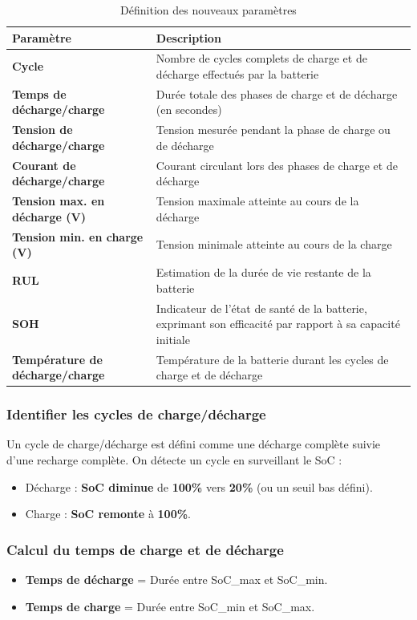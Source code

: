 \begin{table}[H]
	\centering
	\caption{Définition des nouveaux paramètres}
	\begin{tabular}{|p{6cm}|p{9cm}|}
		\hline
		\textbf{Paramètre} & \textbf{Description} \\
		\hline
		\textbf{Cycle} & Nombre de cycles complets de charge et de décharge effectués par la batterie \\
		\hline
		\textbf{Temps de décharge/charge} & Durée totale des phases de charge et de décharge (en secondes) \\
		\hline
		\textbf{Tension de décharge/charge} & Tension mesurée pendant la phase de charge ou de décharge \\
		\hline
		\textbf{Courant de décharge/charge} & Courant circulant lors des phases de charge et de décharge \\
		\hline
		\textbf{Tension max. en décharge (V)} & Tension maximale atteinte au cours de la décharge \\
		\hline
		\textbf{Tension min. en charge (V)} & Tension minimale atteinte au cours de la charge \\
		\hline
		\textbf{RUL} & Estimation de la durée de vie restante de la batterie \\
		\hline
		\textbf{SOH} & Indicateur de l'état de santé de la batterie, exprimant son efficacité par rapport à sa capacité initiale \\
		\hline
		\textbf{Température de décharge/charge} & Température de la batterie durant les cycles de charge et de décharge \\
		\hline
	\end{tabular}
\end{table}


\subsubsection*{Identifier les cycles de charge/décharge}
Un cycle de charge/décharge est défini comme une décharge complète suivie d'une recharge complète. On détecte un cycle en surveillant le SoC :

\begin{itemize}
	\item Décharge : \textbf{SoC diminue} de \textbf{100\%} vers \textbf{20\%} (ou un seuil bas défini).
	\item Charge : \textbf{SoC remonte} à \textbf{100\%}.
\end{itemize}

\subsubsection*{Calcul du temps de charge et de décharge}
\begin{itemize}
	\item \textbf{Temps de décharge} = Durée entre SoC\_max et SoC\_min.
	\item \textbf{Temps de charge} = Durée entre SoC\_min et SoC\_max.
\end{itemize}


